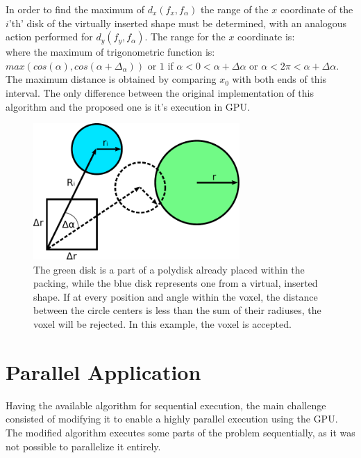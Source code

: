 \documentclass[12pt, oneside]{report}
\begin{document}
In order to find the maximum of $d_x(f_x,f_{\alpha})$ the range of the $x$ coordinate of the $i$'th' disk of the virtually inserted shape must be determined, with an analogous action performed for $d_y(f_y,f_{\alpha})$. The range for the $x$ coordinate is:
\begin{equation*}
[x + R_i \cdot \min_{f_{\alpha} \in [0,1)} cos(\alpha_i + f_{\alpha} \cdot \Delta \alpha), x + \Delta r + R_i \cdot \max_{f_{\alpha} \in [0,1)} cos(\alpha_i + f_{\alpha} \cdot \Delta \alpha)]
\end{equation*}
where the maximum of trigonometric function is: $max (cos(\alpha), cos(\alpha + \Delta_{\alpha})) $ or
$1$ if $ \alpha<0<\alpha + \Delta \alpha $ or $ \alpha< 2 \pi <\alpha + \Delta \alpha$.
The maximum distance is obtained by comparing $x_0$ with both ends of this interval. \newline
The only difference between the original implementation of this algorithm and the proposed one is it's execution in GPU.

\begin{figure}[H]
  \centering
	\label{CieslaAlgorithmDemo}
	\includegraphics[width=0.7\textwidth,keepaspectratio]{Images/CieslaAlgorithm/drawing.pdf}
	\caption{The green disk is a part of a polydisk already placed within the packing, while the blue disk represents one from a virtual, inserted shape. If at every position and angle within the voxel, the distance between the circle centers is less than the sum of their radiuses, the voxel will be rejected. In this example, the voxel is accepted.}
\end{figure}

\section {Parallel Application}

Having the available algorithm for sequential execution, the main challenge consisted of modifying it to enable a highly parallel execution using the GPU. The modified algorithm executes some parts of the problem sequentially, as it was not possible to parallelize it entirely.
\end{document}
